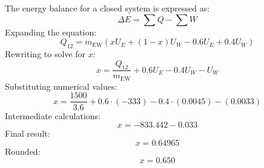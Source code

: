 The energy balance for a closed system is expressed as:  
\[
\Delta E = \sum Q - \sum W
\]  
Expanding the equation:  
\[
Q_{12} = m_{\text{EW}} \left( x U_E + (1 - x) U_W - 0.6 U_E + 0.4 U_W \right)
\]  
Rewriting to solve for \( x \):  
\[
x = \frac{Q_{12}}{m_{\text{EW}}} + 0.6 U_E - 0.4 U_W - U_W
\]  
Substituting numerical values:  
\[
x = \frac{1500}{3.6} + 0.6 \cdot (-333) - 0.4 \cdot (0.0045) - (0.0033)
\]  
Intermediate calculations:  
\[
x = -833.442 - 0.033
\]  
Final result:  
\[
x = 0.64965
\]  
Rounded:  
\[
x = 0.650
\]